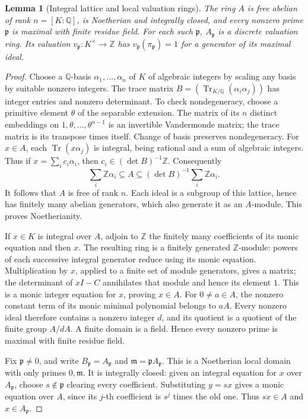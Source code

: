 \documentclass[11pt,a4paper]{article}
\newtheorem{lemma}[theorem]{Lemma}
\theoremstyle{definition}\newtheorem{definition}[theorem]{Definition}
\begin{document}
\begin{lemma}[Integral lattice and local valuation rings]\label{lem:sz-dedekind}
The ring \(A\) is free abelian of rank \(n=[K:\mathbb Q]\),
is Noetherian and integrally closed, and every nonzero prime
\(\mathfrak p\) is maximal with finite residue field.
For each such \(\mathfrak p\), \(A_{\mathfrak p}\) is a discrete
valuation ring. Its valuation \(v_{\mathfrak p}:K^\times\to\mathbb Z\)
has \(v_{\mathfrak p}(\pi_{\mathfrak p})=1\) for a generator of its
maximal ideal.
\end{lemma}
\begin{proof}
Choose a \(\mathbb Q\)-basis \(\alpha_1,\ldots,\alpha_n\) of \(K\)
of algebraic integers by scaling any basis by suitable nonzero integers.
The trace matrix
\(B=(\operatorname{Tr}_{K/\mathbb Q}(\alpha_i\alpha_j))\)
has integer entries and nonzero determinant. To check nondegeneracy,
choose a primitive element \(\theta\) of the separable extension.
The matrix of its \(n\) distinct embeddings on
\(1,\theta,\ldots,\theta^{n-1}\) is an invertible Vandermonde matrix;
the trace matrix is its transpose times itself. Change of basis
preserves nondegeneracy.
For \(x\in A\), each \(\operatorname{Tr}(x\alpha_j)\) is integral,
being rational and a sum of algebraic integers. Thus if
\(x=\sum_i c_i\alpha_i\), then
\(c_i\in(\det B)^{-1}\mathbb Z\). Consequently
\[
 \sum_i\mathbb Z\alpha_i\subseteq A
 \subseteq(\det B)^{-1}\sum_i\mathbb Z\alpha_i .
\]
It follows that \(A\) is free of rank \(n\). Each ideal is a subgroup
of this lattice, hence has finitely many abelian generators, which
also generate it as an \(A\)-module. This proves Noetherianity.

If \(x\in K\) is integral over \(A\), adjoin to \(\mathbb Z\) the
finitely many coefficients of its monic equation and then \(x\).
The resulting ring is a finitely generated \(\mathbb Z\)-module:
powers of each successive integral generator reduce using its monic
equation. Multiplication by \(x\), applied to a finite set of module
generators, gives a matrix; the determinant of \(xI-C\) annihilates
that module and hence its element \(1\). This is a monic integer
equation for \(x\), proving \(x\in A\).
For \(0\ne a\in A\), the nonzero constant term of its monic minimal
polynomial belongs to \(aA\). Every nonzero ideal therefore contains
a nonzero integer \(d\), and its quotient is a quotient of the finite
group \(A/dA\). A finite domain is a field. Hence every nonzero prime
is maximal with finite residue field.

Fix \(\mathfrak p\ne0\), and write \(B_{\mathfrak p}=A_{\mathfrak p}\)
and \(\mathfrak m=\mathfrak p A_{\mathfrak p}\).
This is a Noetherian local domain with only primes \(0,\mathfrak m\).
It is integrally closed: given an integral equation for \(x\) over
\(A_{\mathfrak p}\), choose \(s\notin\mathfrak p\) clearing every
coefficient. Substituting \(y=sx\) gives a monic equation over \(A\),
since its \(j\)-th coefficient is \(s^j\) times the old one. Thus
\(sx\in A\) and \(x\in A_{\mathfrak p}\).


\end{proof}
\end{document}
